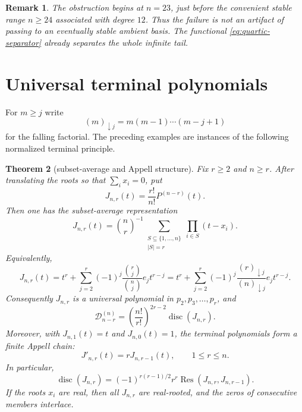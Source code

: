 \documentclass[11pt]{amsart}
\numberwithin{equation}{section}
\newtheorem{theorem}{Theorem}
\newtheorem{remark}[theorem]{Remark}
\newcommand{\D}{\mathcal D}
\newcommand{\Res}{\operatorname{Res}}
\newcommand{\disc}{\operatorname{disc}}
\begin{document}
\begin{remark}
The obstruction begins at $n=23$, just before the convenient stable range
$n\ge24$ associated with degree $12$.  Thus the failure is not an artifact of
passing to an eventually stable ambient basis.  The functional
\eqref{eq:quartic-separator} already separates the whole infinite tail.
\end{remark}

\section{Universal terminal polynomials}

For $m\ge j$ write
\[
(m)_{\downarrow j}=m(m-1)\cdots(m-j+1)
\]
for the falling factorial.  The preceding examples are instances of the
following normalized terminal principle.

\begin{theorem}[subset-average and Appell structure]\label{thm:terminal-normalized}
Fix $r\ge2$ and $n\ge r$.  After translating the roots so that
$\sum_i x_i=0$, put
\[
J_{n,r}(t)=\frac{r!}{n!}P^{(n-r)}(t).
\]
Then one has the subset-average representation
\begin{equation}\label{eq:subset-average}
J_{n,r}(t)=\binom nr^{-1}
\sum_{\substack{S\subseteq\{1,\ldots,n\}\\ |S|=r}}
\prod_{i\in S}(t-x_i).
\end{equation}
Equivalently,
\begin{equation}\label{eq:terminal-coefficients}
J_{n,r}(t)
=t^r+\sum_{j=2}^r(-1)^j
\frac{\binom rj}{\binom nj}e_jt^{r-j}
=t^r+\sum_{j=2}^r(-1)^j
\frac{(r)_{\downarrow j}}{(n)_{\downarrow j}}e_jt^{r-j}.
\end{equation}
Consequently $J_{n,r}$ is a universal polynomial in
$p_2,p_3,\ldots,p_r$, and
\[
\D_{n-r}^{(n)}=\left(\frac{n!}{r!}\right)^{2r-2}
\disc(J_{n,r}).
\]
Moreover, with $J_{n,1}(t)=t$ and $J_{n,0}(t)=1$, the terminal polynomials
form a finite Appell chain:
\begin{equation}\label{eq:appell}
J'_{n,r}(t)=rJ_{n,r-1}(t),\qquad 1\le r\le n.
\end{equation}
In particular,
\begin{equation}\label{eq:terminal-resultant}
\disc(J_{n,r})
=(-1)^{r(r-1)/2}r^r\Res(J_{n,r},J_{n,r-1}).
\end{equation}
If the roots $x_i$ are real, then all $J_{n,r}$ are real-rooted, and the
zeros of consecutive members interlace.
\end{theorem}
\end{document}
